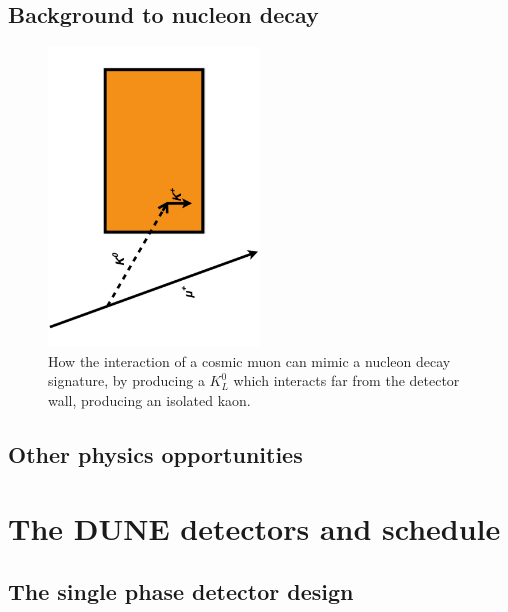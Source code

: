 \subsection{Background to nucleon decay} \label{sec:BkNDK}  %

\begin{figure}[h!]
  \centering
  \includegraphics[width=0.5\textwidth]{KaonNDKInteraction}
  \caption[How the interaction of a cosmic muon can mimic a nucleon decay signature]
          {How the interaction of a cosmic muon can mimic a nucleon decay signature, by producing a $K^{0}_{L}$ which interacts far from the detector wall, producing an isolated kaon.}
  \label{fig:K0LongBackground}
\end{figure}

\subsection{Other physics opportunities} \label{sec:DUNE_Other}%

\section{The DUNE detectors and schedule} \label{sec:DUNEDetector} %

\subsection{The single phase detector design} \label{sec:DUNEDetector_SP}


